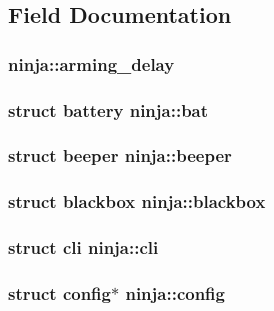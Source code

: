 \subsection{Field Documentation}
\hypertarget{structninja_a5b029648fc562a396801ec821f023425}{
\subsubsection[{arming\+\_\+delay}]{ ninja\+::arming\+\_\+delay}}\label{structninja_a5b029648fc562a396801ec821f023425}
\hypertarget{structninja_ad96b8d0784e9c040a0d7aa035343267f}{
\subsubsection[{bat}]{\setlength{\rightskip}{0pt plus 5cm}struct {\bf battery} ninja\+::bat}}\label{structninja_ad96b8d0784e9c040a0d7aa035343267f}
\hypertarget{structninja_a9ccb6f5f224cd1f6c3678521a27d81da}{
\subsubsection[{beeper}]{\setlength{\rightskip}{0pt plus 5cm}struct {\bf beeper} ninja\+::beeper}}\label{structninja_a9ccb6f5f224cd1f6c3678521a27d81da}
\hypertarget{structninja_ab9d67ba52c2718aee3e74ef1aa0dc949}{
\subsubsection[{blackbox}]{\setlength{\rightskip}{0pt plus 5cm}struct {\bf blackbox} ninja\+::blackbox}}\label{structninja_ab9d67ba52c2718aee3e74ef1aa0dc949}
\hypertarget{structninja_a5968432bc72bca4807cf2900446bca59}{
\subsubsection[{cli}]{\setlength{\rightskip}{0pt plus 5cm}struct {\bf cli} ninja\+::cli}}\label{structninja_a5968432bc72bca4807cf2900446bca59}
\hypertarget{structninja_a060c836bd8d8a6653d07fd59a7dd59e1}{
\subsubsection[{config}]{\setlength{\rightskip}{0pt plus 5cm}struct {\bf config}$\ast$ ninja\+::config}}\label{structninja_a060c836bd8d8a6653d07fd59a7dd59e1}


